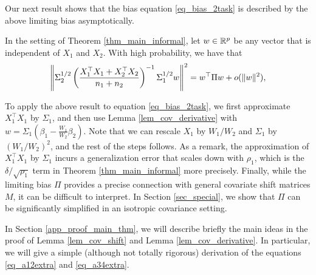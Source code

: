 Our next result shows that the bias equation \eqref{eq_bias_2task} is described by the above limiting bias asymptotically.
\begin{lemma}\label{lem_cov_derivative}
In the setting of Theorem \ref{thm_main_informal}, let $w \in \mathbb{R}^p$ be any vector that is independent of $X_1$ and $X_2$.
With high probability, we have that
\begin{equation}\label{lem_cov_derv_eq}
\begin{split}
\left\| \Sigma_2^{1/2} \left({\frac{X_1^{\top}X_1 + X_2^{\top}X_2}{n_1 + n_2}}\right)^{-1} \Sigma_1^{1/2} w \right\|^2
= w^{\top} \Pi w + o(\|w\|^2),
\end{split}
\end{equation}

\end{lemma}
To apply the above result to equation \eqref{eq_bias_2task}, we first approximate $X_1^{\top}X_1$ by $\Sigma_1$, and then use Lemma \ref{lem_cov_derivative} with $w = \Sigma_1 (\beta_1 - \frac{W_1}{W_2} \beta_2)$.
Note that we can rescale $X_1$ by $W_1 / W_2$ and $\Sigma_1$ by $(W_1 / W_2)^2$, and the rest of the steps follows.
As a remark, the approximation of $X_1^{\top}X_1$ by $\Sigma_1$ incurs a generalization error that scales down with $\rho_1$, which is the $\delta / \sqrt{\rho_1}$ term in Theorem \ref{thm_main_informal} more precisely.
Finally, while the limiting bias $\Pi$ provides a precise connection with general covariate shift matrices $M$, it can be difficult to interpret.
In Section \ref{sec_special}, we show that $\Pi$ can be significantly simplified in an isotropic covariance setting.

In Section \ref{app_proof_main_thm}, we will describe briefly the main ideas in the proof of Lemma \ref{lem_cov_shift} and Lemma \ref{lem_cov_derivative}. In particular, we will give a simple (although not totally rigorous) derivation of the equations \eqref{eq_a12extra} and \eqref{eq_a34extra}.











